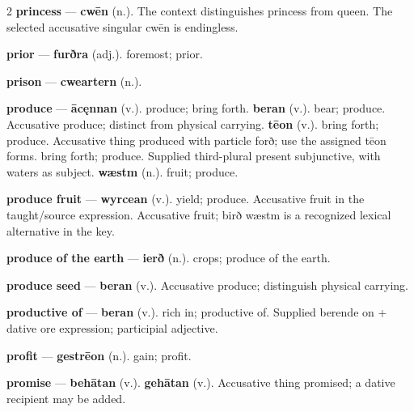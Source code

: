 \begin{multicols}{2}
\textbf{princess} — \textbf{cwēn} (n.). The context distinguishes princess from queen. The selected accusative singular cwēn is endingless.\par
\textbf{prior} — \textbf{furðra} (adj.). foremost; prior.\par
\textbf{prison} — \textbf{cweartern} (n.).\par
\textbf{produce} — \textbf{ācęnnan} (v.). produce; bring forth. \textbf{beran} (v.). bear; produce. Accusative produce; distinct from physical carrying. \textbf{tēon} (v.). bring forth; produce. Accusative thing produced with particle forð; use the assigned tēon forms. bring forth; produce. Supplied third-plural present subjunctive, with waters as subject. \textbf{wæstm} (n.). fruit; produce.\par
\textbf{produce fruit} — \textbf{wyrcean} (v.). yield; produce. Accusative fruit in the taught/source expression. Accusative fruit; birð wæstm is a recognized lexical alternative in the key.\par
\textbf{produce of the earth} — \textbf{ierð} (n.). crops; produce of the earth.\par
\textbf{produce seed} — \textbf{beran} (v.). Accusative produce; distinguish physical carrying.\par
\textbf{productive of} — \textbf{beran} (v.). rich in; productive of. Supplied berende on + dative ore expression; participial adjective.\par
\textbf{profit} — \textbf{gestrēon} (n.). gain; profit.\par
\textbf{promise} — \textbf{behātan} (v.).  \textbf{gehātan} (v.). Accusative thing promised; a dative recipient may be added.\par

\end{multicols}
